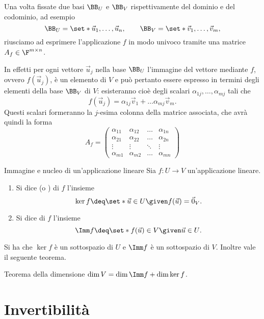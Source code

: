Una volta fissate due basi $\BB_U$ e $\BB_V$ rispettivamente del dominio e del codominio, ad esempio \[
    \BB_U = \set*{\vec u_1, \dots, \vec u_n}, \qquad \BB_V = \set*{\vec v_1, \dots, \vec v_m},
\] riusciamo ad esprimere l'applicazione $f$ in modo univoco tramite una matrice $A_f \in \Mat{\F, m, n}$. 

In effetti per ogni vettore $\vec u_j$ nella base $\BB_U$ l'immagine del vettore mediante $f$, ovvero $f(\vec u_j)$, è un elemento di $V$ e può pertanto essere espresso in termini degli elementi della base $\BB_V$ di $V$: esisteranno cioè degli scalari $\alpha_{1j}, \dots, \alpha_{mj}$ tali che \[
    f(\vec u_j) = \alpha_{1j}\vec v_1 + \dots \alpha_{mj}\vec v_m.
\] Questi scalari formeranno la $j$-esima colonna della matrice associata, che avrà quindi la forma \[
    A_f = \begin{pmatrix}
        \alpha_{11} &\alpha_{12} &\dots    &\alpha_{1n} \\
        \alpha_{21} &\alpha_{22} &\dots    &\alpha_{2n} \\
        \vdots      &\vdots      &\ddots   &\vdots      \\
        \alpha_{m1} &\alpha_{m2} &\dots    &\alpha_{mn}
    \end{pmatrix}
\]

\begin{definition}
    {Immagine e nucleo di un'applicazione lineare}{}
    Sia $f : U \to V$ un'applicazione lineare.
    \begin{enumerate}[(1)]
        \item Si dice  (o ) di $f$ l'insieme \[
            \ker f \deq \set*{\vec u \in U \given f(\vec u) = \vec 0_V}.
        \]
        \item Si dice  di $f$ l'insieme \[
            \Imm f \deq \set*{f(\vec u) \in V \given \vec u \in U}.
        \]
    \end{enumerate}
\end{definition}

Si ha che $\ker f$ è un sottospazio di $U$ e $\Imm f$ è un sottospazio di $V$. Inoltre vale il seguente teorema.

\begin{theorem}
    {Teorema della dimensione}{} $\dim V = \dim \Imm f + \dim \ker f$. 
\end{theorem}

\section{Invertibilità}

